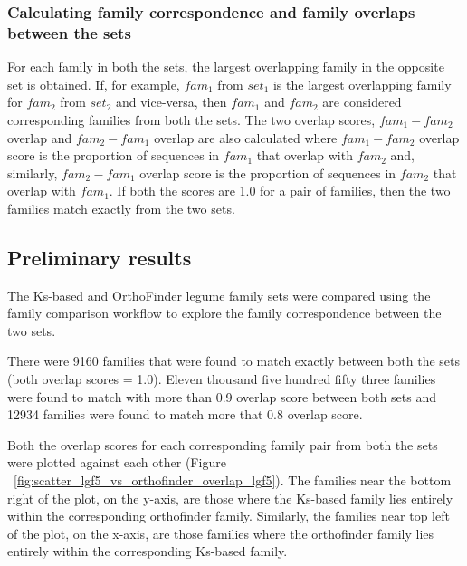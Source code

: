 \documentclass{article}
\begin{document}
			\subsubsection{Calculating family correspondence and family overlaps between the sets}
			For each family in both the sets, the largest overlapping family in the opposite set  is obtained. If, for example, $fam_1$ from $set_1$ is the largest overlapping family for $fam_2$ from $set_2$ and vice-versa, then $fam_1$ and $fam_2$ are considered corresponding families from both the sets. The two overlap scores, $fam_1-fam_2$ overlap and $fam_2-fam_1$ overlap are also calculated where $fam_1-fam_2$ overlap score is the proportion of sequences in $fam_1$ that overlap with $fam_2$ and, similarly, $fam_2-fam_1$ overlap score is the proportion of sequences in $fam_2$ that overlap with $fam_1$. If both the scores are 1.0 for a pair of families, then the two families match exactly from the two sets.
			
		\subsection{Preliminary results}
		The Ks-based and OrthoFinder legume family sets were compared using the family comparison workflow to explore the family correspondence between the two sets.
		
		There were 9160 families that were found to match exactly between both the sets (both overlap scores = 1.0). Eleven thousand five hundred fifty three families were found to match with more than 0.9 overlap score between both sets and 12934 families were found to match more that 0.8 overlap score.
		
		Both the overlap scores for each corresponding family pair from both the sets were plotted against each other (Figure ~\ref{fig:scatter_lgf5_vs_orthofinder_overlap_lgf5}). The families near the bottom right of the plot, on the y-axis, are those where the Ks-based family lies entirely within the corresponding orthofinder family. Similarly, the families near top left of the plot, on the x-axis,  are those families where the orthofinder family lies entirely within the corresponding Ks-based family.
		  
\end{document}
